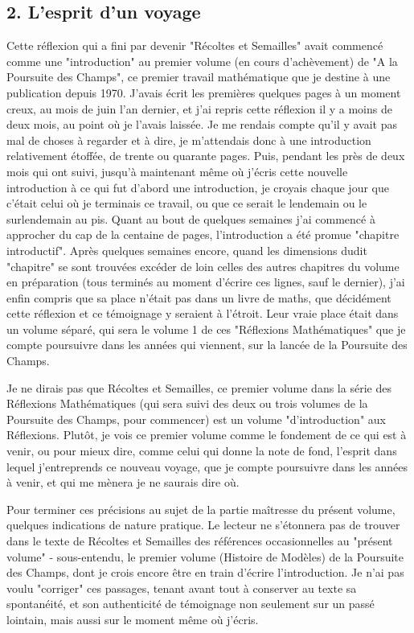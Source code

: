 \subsection{2. L'esprit d'un voyage}

Cette réflexion qui a fini par devenir "Récoltes et Semailles" avait commencé comme une "introduction" au premier volume (en cours d'achèvement) de "A la Poursuite des Champs", ce premier travail mathématique que je destine à une publication depuis 1970. J'avais écrit les premières quelques pages à un moment creux, au mois de juin l'an dernier, et j'ai repris cette réflexion il y a moins de deux mois, au point où je l'avais laissée. Je me rendais compte qu'il y avait pas mal de choses à regarder et à dire, je m'attendais donc à une introduction relativement étoffée, de trente ou quarante pages. Puis, pendant les près de deux mois qui ont suivi, jusqu'à maintenant même où j'écris cette nouvelle introduction à ce qui fut d'abord une introduction, je croyais chaque jour que c'était celui où je terminais ce travail, ou que ce serait le lendemain ou le surlendemain au pis. Quant au bout de quelques semaines j'ai commencé à approcher du cap de la centaine de pages, l'introduction a été promue "chapitre introductif". Après quelques semaines encore, quand les dimensions dudit "chapitre" se sont trouvées excéder de loin celles des autres chapitres du volume en préparation (tous terminés au moment d'écrire ces lignes, sauf le dernier), j'ai enfin compris que sa place n'était pas dans un livre de maths, que décidément cette réflexion et ce témoignage y seraient à l'étroit. Leur vraie place était dans un volume séparé, qui sera le volume 1 de ces "Réflexions Mathématiques" que je compte poursuivre dans les années qui viennent, sur la lancée de la Poursuite des Champs.

Je ne dirais pas que Récoltes et Semailles, ce premier volume dans la série des Réflexions Mathématiques (qui sera suivi des deux ou trois volumes de la Poursuite des Champs, pour commencer) est un volume "d'introduction" aux Réflexions. Plutôt, je vois ce premier volume comme le fondement de ce qui est à venir, ou pour mieux dire, comme celui qui donne la note de fond, l'esprit dans lequel j'entreprends ce nouveau voyage, que je compte poursuivre dans les années à venir, et qui me mènera je ne saurais dire où.

Pour terminer ces précisions au sujet de la partie maîtresse du présent volume, quelques indications de nature pratique. Le lecteur ne s'étonnera pas de trouver dans le texte de Récoltes et Semailles des références occasionnelles au "présent volume" - sous-entendu, le premier volume (Histoire de Modèles) de la Poursuite des Champs, dont je crois encore être en train d'écrire l'introduction. Je n'ai pas voulu "corriger" ces passages, tenant avant tout à conserver au texte sa spontanéité, et son authenticité de témoignage non seulement sur un passé lointain, mais aussi sur le moment même où j'écris.

